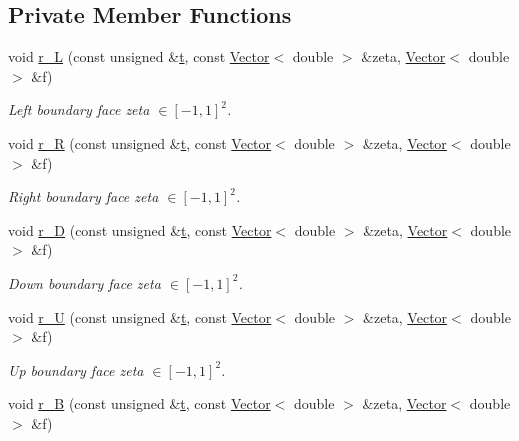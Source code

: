 \subsection*{Private Member Functions}
\begin{DoxyCompactItemize}
\item 
void \hyperlink{classoomph_1_1WarpedCubeDomain_a8b2734f9c86307ed64077bd2fb653e10}{r\+\_\+L} (const unsigned \&\hyperlink{cfortran_8h_af6f0bd3dc13317f895c91323c25c2b8f}{t}, const \hyperlink{classoomph_1_1Vector}{Vector}$<$ double $>$ \&zeta, \hyperlink{classoomph_1_1Vector}{Vector}$<$ double $>$ \&f)
\begin{DoxyCompactList}\small\item\em Left boundary face zeta $ \in [-1,1]^2 $. \end{DoxyCompactList}\item 
void \hyperlink{classoomph_1_1WarpedCubeDomain_a42c199ecf6819cbfe5e07bdd65954b69}{r\+\_\+R} (const unsigned \&\hyperlink{cfortran_8h_af6f0bd3dc13317f895c91323c25c2b8f}{t}, const \hyperlink{classoomph_1_1Vector}{Vector}$<$ double $>$ \&zeta, \hyperlink{classoomph_1_1Vector}{Vector}$<$ double $>$ \&f)
\begin{DoxyCompactList}\small\item\em Right boundary face zeta $ \in [-1,1]^2 $. \end{DoxyCompactList}\item 
void \hyperlink{classoomph_1_1WarpedCubeDomain_a9bb17632961940decb3fd8977fb11e94}{r\+\_\+D} (const unsigned \&\hyperlink{cfortran_8h_af6f0bd3dc13317f895c91323c25c2b8f}{t}, const \hyperlink{classoomph_1_1Vector}{Vector}$<$ double $>$ \&zeta, \hyperlink{classoomph_1_1Vector}{Vector}$<$ double $>$ \&f)
\begin{DoxyCompactList}\small\item\em Down boundary face zeta $ \in [-1,1]^2 $. \end{DoxyCompactList}\item 
void \hyperlink{classoomph_1_1WarpedCubeDomain_a1f9227fe44a88e0bd4b2106b8a40643b}{r\+\_\+U} (const unsigned \&\hyperlink{cfortran_8h_af6f0bd3dc13317f895c91323c25c2b8f}{t}, const \hyperlink{classoomph_1_1Vector}{Vector}$<$ double $>$ \&zeta, \hyperlink{classoomph_1_1Vector}{Vector}$<$ double $>$ \&f)
\begin{DoxyCompactList}\small\item\em Up boundary face zeta $ \in [-1,1]^2 $. \end{DoxyCompactList}\item 
void \hyperlink{classoomph_1_1WarpedCubeDomain_aa3bb55f2a3f50fde4693cabccf3efa7d}{r\+\_\+B} (const unsigned \&\hyperlink{cfortran_8h_af6f0bd3dc13317f895c91323c25c2b8f}{t}, const \hyperlink{classoomph_1_1Vector}{Vector}$<$ double $>$ \&zeta, \hyperlink{classoomph_1_1Vector}{Vector}$<$ double $>$ \&f)

\end{DoxyCompactItemize}
